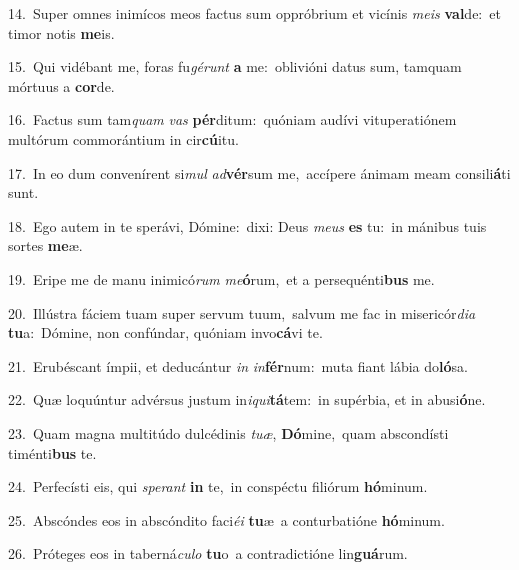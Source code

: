 {\numbfont\textcolor{\numbcolor}{14.}}~Super omnes inimícos meos factus sum oppróbrium et vicínis \textit{me}\-\textit{is} \textbf{val}\-de:~\star et timor notis \textbf{me}\-is.\par
{\numbfont\textcolor{\numbcolor}{15.}}~Qui vidébant me, foras fu\-\textit{gé}\-\textit{runt} \textbf{a} me:~\star oblivióni datus sum, tamquam mórtuus a \textbf{cor}\-de.\par
{\numbfont\textcolor{\numbcolor}{16.}}~Factus sum tam\textit{quam} \textit{vas} \textbf{pér}\-ditum:~\star quóniam audívi vituperatiónem multórum commorántium in cir\-\textbf{cú}\-itu.\par
{\numbfont\textcolor{\numbcolor}{17.}}~In eo dum convenírent si\textit{mul} \textit{ad}\-\textbf{vér}sum me,~\star accípere ánimam meam consili\-\textbf{á}\-ti sunt.\par
{\numbfont\textcolor{\numbcolor}{18.}}~Ego autem in te sperávi, Dómine:~\dagger dixi: Deus \textit{me}\-\textit{us} \textbf{es} tu:~\star in mánibus tuis sortes \textbf{me}\-æ.\par
{\numbfont\textcolor{\numbcolor}{19.}}~Eripe me de manu inimicó\textit{rum} \textit{me}\-\textbf{ó}rum,~\star et a persequénti\textbf{bus} me.\par
{\numbfont\textcolor{\numbcolor}{20.}}~Illústra fáciem tuam super servum tuum,~\dagger salvum me fac in misericór\-\textit{di}\-\textit{a} \textbf{tu}\-a:~\star Dómine, non confúndar, quóniam invo\-\textbf{cá}\-vi te.\par
{\numbfont\textcolor{\numbcolor}{21.}}~Erubéscant ímpii, et deducántur \textit{in} \textit{in}\-\textbf{fér}num:~\star muta fiant lábia do\-\textbf{ló}\-sa.\par
{\numbfont\textcolor{\numbcolor}{22.}}~Quæ loquúntur advérsus justum in\-\textit{i}\-\textit{qui}\textbf{tá}tem:~\star in supérbia, et in abusi\-\textbf{ó}\-ne.\par
{\numbfont\textcolor{\numbcolor}{23.}}~Quam magna multitúdo dulcédinis \textit{tu}\-\textit{æ}, \textbf{Dó}\-mine,~\star quam abscondísti timénti\textbf{bus} te.\par
{\numbfont\textcolor{\numbcolor}{24.}}~Perfecísti eis, qui \textit{spe}\-\textit{rant} \textbf{in} te,~\star in conspéctu filiórum \textbf{hó}\-minum.\par
{\numbfont\textcolor{\numbcolor}{25.}}~Abscóndes eos in abscóndito faci\-\textit{é}\-\textit{i} \textbf{tu}\-æ~\star a conturbatióne \textbf{hó}\-minum.\par
{\numbfont\textcolor{\numbcolor}{26.}}~Próteges eos in taberná\-\textit{cu}\-\textit{lo} \textbf{tu}\-o~\star a contradictióne lin\-\textbf{guá}\-rum.\par
